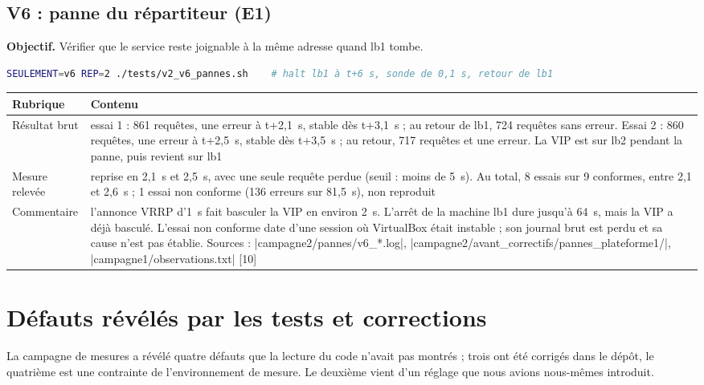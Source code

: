 \documentclass[a4paper,11pt]{article}
\begin{document}
\subsection{V6 : panne du répartiteur (E1)}
\textbf{Objectif.} Vérifier que le service reste joignable à la même adresse quand lb1 tombe.
\begin{lstlisting}[language=bash]
SEULEMENT=v6 REP=2 ./tests/v2_v6_pannes.sh    # halt lb1 à t+6 s, sonde de 0,1 s, retour de lb1
\end{lstlisting}
{\small
\begin{longtable}{@{}L{3.2cm}L{12.4cm}@{}}
\toprule
\textbf{Rubrique} & \textbf{Contenu}\\ \midrule\endhead
Résultat brut & essai 1 : 861 requêtes, une erreur à t+2,1~s, stable dès t+3,1~s ; au retour de lb1, 724 requêtes sans erreur. Essai 2 : 860 requêtes, une erreur à t+2,5~s, stable dès t+3,5~s ; au retour, 717 requêtes et une erreur. La VIP est sur lb2 pendant la panne, puis revient sur lb1\\
Mesure relevée & reprise en 2,1~s et 2,5~s, avec une seule requête perdue (seuil : moins de 5~s). Au total, 8 essais sur 9 conformes, entre 2,1 et 2,6~s ; 1 essai non conforme (136 erreurs sur 81,5~s), non reproduit\\
Commentaire & l'annonce VRRP d'1~s fait basculer la VIP en environ 2~s. L'arrêt de la machine lb1 dure jusqu'à 64~s, mais la VIP a déjà basculé. L'essai non conforme date d'une session où VirtualBox était instable ; son journal brut est perdu et sa cause n'est pas établie. Sources : |campagne2/pannes/v6_*.log|, |campagne2/avant_correctifs/pannes_plateforme1/|, |campagne1/observations.txt| [10]\\
\bottomrule
\end{longtable}}

\section{Défauts révélés par les tests et corrections}
\label{sec:defauts}

La campagne de mesures a révélé quatre défauts que la lecture du code n'avait pas montrés ; trois ont été corrigés dans le dépôt, le quatrième est une contrainte de l'environnement de mesure. Le deuxième vient d'un réglage que nous avions nous-mêmes introduit.
\end{document}
